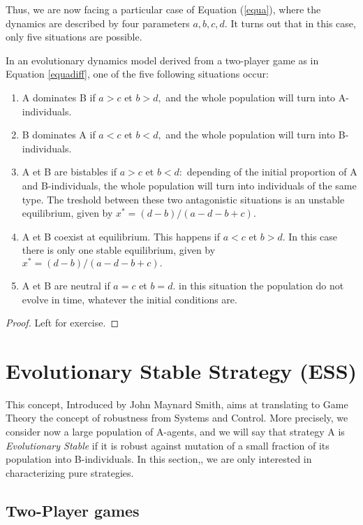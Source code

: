 Thus, we are now facing a particular case of Equation (\ref{equa}), where the dynamics are described by four parameters $a,b,c,d.$
It turns out that in this case, only five situations are possible.
\begin{theorem}
In an evolutionary dynamics model derived from a two-player game as in Equation \eqref{equadiff}, one of the five following situations occur:
\begin{enumerate}
\item A dominates B if $a>c$ et $b>d,$ and the whole population will turn into A-individuals.
\item B dominates A if $a<c$ et $b<d,$ and the whole population will turn into B-individuals.
\item A et B are bistables if $a>c$ et $b<d:$ depending of the initial proportion of A and B-individuals, the whole population will turn into individuals of the same type. The treshold between these two antagonistic situations is an unstable equilibrium, given by $x^*=(d-b)/(a-d-b+c).$
\item A et B coexist at equilibrium.  This happens if $a<c$ et $b>d.$  In this case there is only one stable equilibrium, given by $x^*=(d-b)/(a-d-b+c).$
\item A et B are neutral if $a=c$ et $b=d.$ in this situation the population do not evolve in time, whatever the initial conditions are.
\end{enumerate}
\end{theorem}
\begin{proof}
Left for exercise.
\end{proof}

\section{Evolutionary Stable Strategy (ESS)}

This concept, Introduced by John Maynard Smith, aims at translating to Game Theory the concept of robustness from Systems and Control.  More precisely, we consider now a large population of A-agents, and we will say that strategy A is \emph{Evolutionary Stable} if it is robust against mutation of a small fraction of its population into B-individuals.
In this section,, we are only interested in characterizing pure strategies.
\subsection{Two-Player games}

